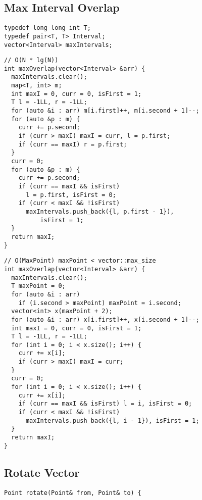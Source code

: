 \documentclass[twoside]{article}
\begin{document}
\begin{multicols*}{2}
\subsection*{Max Interval Overlap}
\begin{verbatim}
typedef long long int T;
typedef pair<T, T> Interval;
vector<Interval> maxIntervals;
\end{verbatim}
\vspace{-12pt}
\begin{verbatim}
// O(N * lg(N))
int maxOverlap(vector<Interval> &arr) {
  maxIntervals.clear();
  map<T, int> m;
  int maxI = 0, curr = 0, isFirst = 1;
  T l = -1LL, r = -1LL;
  for (auto &i : arr) m[i.first]++, m[i.second + 1]--;
  for (auto &p : m) {
    curr += p.second;
    if (curr > maxI) maxI = curr, l = p.first;
    if (curr == maxI) r = p.first;
  }
  curr = 0;
  for (auto &p : m) {
    curr += p.second;
    if (curr == maxI && isFirst)
      l = p.first, isFirst = 0;
    if (curr < maxI && !isFirst)
      maxIntervals.push_back({l, p.first - 1}),
          isFirst = 1;
  }
  return maxI;
}
\end{verbatim}
\vspace{-12pt}
\begin{verbatim}
// O(MaxPoint) maxPoint < vector::max_size
int maxOverlap(vector<Interval> &arr) {
  maxIntervals.clear();
  T maxPoint = 0;
  for (auto &i : arr)
    if (i.second > maxPoint) maxPoint = i.second;
  vector<int> x(maxPoint + 2);
  for (auto &i : arr) x[i.first]++, x[i.second + 1]--;
  int maxI = 0, curr = 0, isFirst = 1;
  T l = -1LL, r = -1LL;
  for (int i = 0; i < x.size(); i++) {
    curr += x[i];
    if (curr > maxI) maxI = curr;
  }
  curr = 0;
  for (int i = 0; i < x.size(); i++) {
    curr += x[i];
    if (curr == maxI && isFirst) l = i, isFirst = 0;
    if (curr < maxI && !isFirst)
      maxIntervals.push_back({l, i - 1}), isFirst = 1;
  }
  return maxI;
}
\end{verbatim}

\subsectionfont{\large\bfseries\sffamily\underline}
\subsection*{Rotate Vector}
\begin{verbatim}
Point rotate(Point& from, Point& to) {
  

\end{verbatim}
\end{multicols*}
\end{document}
